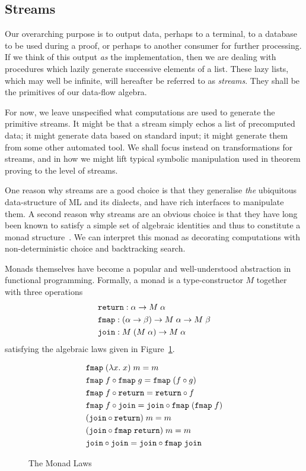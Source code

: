\subsection{Streams}\label{sec:Streams}
Our overarching purpose is to output data, perhaps to a terminal, to a database to be used during a proof, or perhaps to another consumer for further processing. If we think of this output \emph{as} the implementation, then we are dealing with procedures which lazily generate successive elements of a list. These lazy lists, which may well be infinite, will hereafter be referred to as \emph{streams}. They shall be the primitives of our data-flow algebra. 

For now, we leave unspecified what computations are used to generate the primitive streams. It might be that a stream simply echos a list of precomputed data; it might generate data based on standard input; it might generate them from some other automated tool. We shall focus instead on transformations for streams, and in how we might lift typical symbolic manipulation used in theorem proving to the level of streams.

One reason why streams are a good choice is that they generalise \emph{the} ubiquitous data-structure of ML and its dialects, and have rich interfaces to manipulate them. A second reason why streams are an obvious choice is that they have long been known to satisfy a simple set of algebraic identities and thus to constitute a monad structure~\cite{MonadWadler}. We can interpret this monad as decorating computations with non-deterministic choice and backtracking search. 

Monads themselves have become a popular and well-understood abstraction in functional programming. Formally, a monad is a type-constructor $M$ together with three operations 
\begin{align*}
&\texttt{return} : \alpha \rightarrow M\;\alpha\\
&\texttt{fmap} : (\alpha \rightarrow \beta) \rightarrow M\;\alpha \rightarrow M\;\beta\\
&\texttt{join} : M\;(M\;\alpha) \rightarrow M\;\alpha
\end{align*}
satisfying the algebraic laws given in Figure~\ref{fig:MonadLaws}.

\begin{figure}
\begin{align}
&\texttt{fmap}\;(\lambda x.\;x)\;m = m\notag\\
&\texttt{fmap}\;f \circ \texttt{fmap}\;g = \texttt{fmap}\;(f \circ g)\notag\\
&\texttt{fmap}\;f \circ \texttt{return} = \texttt{return}\circ f\notag\\
&\texttt{fmap}\;f \circ \texttt{join} = \texttt{join} \circ \texttt{fmap}\;(\texttt{fmap}\;f)\notag\\
&(\texttt{join} \circ \texttt{return})\;m = m\notag\\
&(\texttt{join} \circ \texttt{fmap}\;\texttt{return})\;m = m\notag\\
&\texttt{join} \circ \texttt{join} = \texttt{join} \circ \texttt{fmap}\;\texttt{join} \label{eq:JoinAssoc}
\end{align}
\caption{The Monad Laws}
\label{fig:MonadLaws}
\end{figure}

